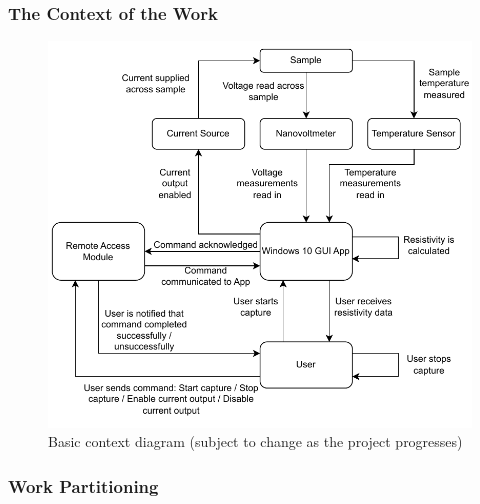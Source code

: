 \documentclass[12pt, titlepage]{article}
\begin{document}
\subsubsection{The Context of the Work}
\begin{figure}[H]
\centerline{\includegraphics[scale=0.9]{ContextDiagram.PDF}}
\caption{Basic context diagram (subject to change as the project progresses)}
\label{fig}
\end{figure}

\subsubsection{Work Partitioning}
\end{document}
